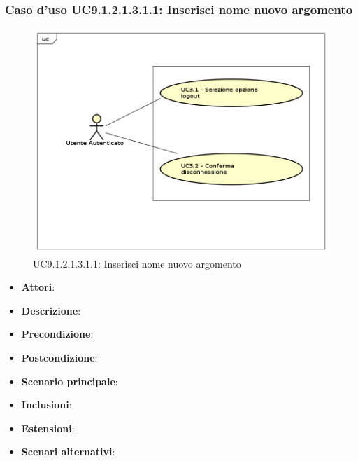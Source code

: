 							\subsubsection{Caso d'uso UC9.1.2.1.3.1.1: Inserisci nome nuovo argomento}
							\label{UC9.1.2.1.3.1.1}
							\begin{figure}[h]
								\centering
								\includegraphics[scale=0.7,keepaspectratio]{UML/UC9.png}
								\caption{UC9.1.2.1.3.1.1: Inserisci nome nuovo argomento}
							\end{figure}
							\FloatBarrier
							\begin{itemize}
								\item \textbf{Attori}: 
								\item \textbf{Descrizione}: 
								\item \textbf{Precondizione}: 
								\item \textbf{Postcondizione}: 
								\item \textbf{Scenario principale}:
								\item \textbf{Inclusioni}:
								\item \textbf{Estensioni}:
								\item \textbf{Scenari alternativi}:
							\end{itemize}
							

